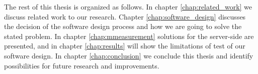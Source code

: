 The rest of this thesis is organized as follows. In chapter \ref{chap:related_work} we discuss related work to our research. Chapter \ref{chap:software_design} discusses the decision of the software design process and how we are going to solve the stated problem. In chapter \ref{chap:mmeasurement} solutions for the server-side are presented, and in chapter \ref{chap:results} will show the limitations of test of our software design. In chapter \ref{chap:conclusion} we conclude this thesis and identify possibilities for future research and improvements.

